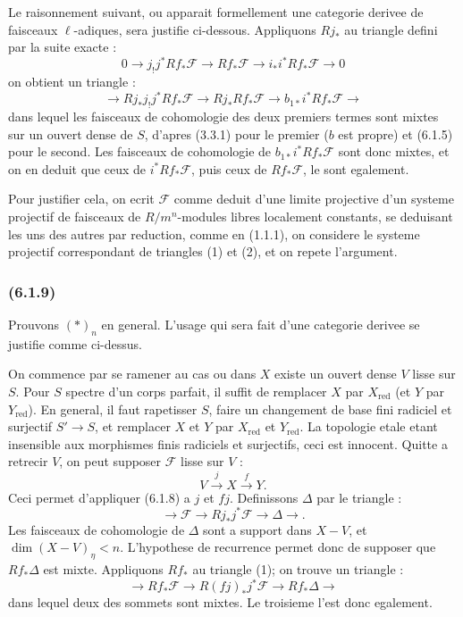 \documentclass[12pt,a4paper]{article}
\theoremstyle{plain}
\theoremstyle{definition}
\theoremstyle{remark}
\newcommand{\red}{\mathrm{red}}
\newcommand{\scrF}{\mathscr{F}}
\begin{document}
Le raisonnement suivant, ou apparait formellement une categorie derivee de faisceaux $\ell$-adiques, sera justifie ci-dessous. Appliquons $Rj_*$ au triangle defini par la suite exacte :
\begin{equation}
0 \to j_! j^* Rf_* \scrF \to Rf_* \scrF \to i_* i^* Rf_* \scrF \to 0
\end{equation}
on obtient un triangle :
\begin{equation}
\to Rj_* j_! j^* Rf_* \scrF \to Rj_* Rf_* \scrF \to b_{1*} i^* Rf_* \scrF \to
\end{equation}
dans lequel les faisceaux de cohomologie des deux premiers termes sont mixtes sur un ouvert dense de $S$, d'apres (3.3.1) pour le premier ($b$ est propre) et (6.1.5) pour le second. Les faisceaux de cohomologie de $b_{1*} i^* Rf_* \scrF$ sont donc mixtes, et on en deduit que ceux de $i^* Rf_* \scrF$, puis ceux de $Rf_* \scrF$, le sont egalement.

Pour justifier cela, on ecrit $\scrF$ comme deduit d'une limite projective d'un systeme projectif de faisceaux de $R/m^n$-modules libres localement constants, se deduisant les uns des autres par reduction, comme en (1.1.1), on considere le systeme projectif correspondant de triangles (1) et (2), et on repete l'argument.

\subsubsection*{\textup{(6.1.9)}}

Prouvons $(*)_n$ en general. L'usage qui sera fait d'une categorie derivee se justifie comme ci-dessus.

On commence par se ramener au cas ou dans $X$ existe un ouvert dense $V$ lisse sur $S$. Pour $S$ spectre d'un corps parfait, il suffit de remplacer $X$ par $X_{\red}$ (et $Y$ par $Y_{\red}$). En general, il faut rapetisser $S$, faire un changement de base fini radiciel et surjectif $S' \to S$, et remplacer $X$ et $Y$ par $X_{\red}$ et $Y_{\red}$. La topologie etale etant insensible aux morphismes finis radiciels et surjectifs, ceci est innocent. Quitte a retrecir $V$, on peut supposer $\scrF$ lisse sur $V$ :
\[
V \xrightarrow{j} X \xrightarrow{f} Y.
\]
Ceci permet d'appliquer (6.1.8) a $j$ et $fj$. Definissons $\Delta$ par le triangle :
\begin{equation}
\to \scrF \to Rj_* j^* \scrF \to \Delta \to.
\end{equation}
Les faisceaux de cohomologie de $\Delta$ sont a support dans $X - V$, et $\dim(X - V)_\eta < n$. L'hypothese de recurrence permet donc de supposer que $Rf_* \Delta$ est mixte. Appliquons $Rf_*$ au triangle (1); on trouve un triangle :
\[
\to Rf_* \scrF \to R(fj)_* j^* \scrF \to Rf_* \Delta \to
\]
dans lequel deux des sommets sont mixtes. Le troisieme l'est donc egalement.
\end{document}
